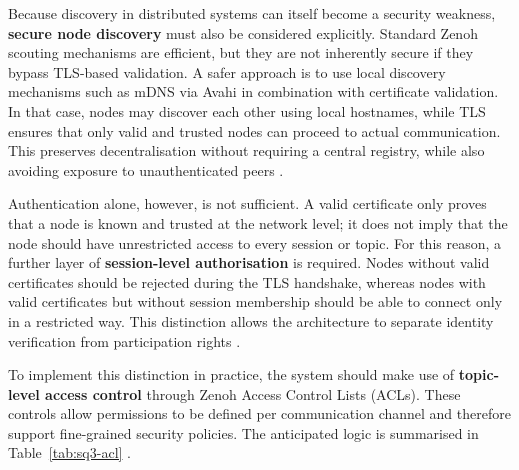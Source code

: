 \documentclass[11pt]{article}
\begin{document}
Because discovery in distributed systems can itself become a security weakness, \textbf{secure node discovery} must also be considered explicitly. Standard Zenoh scouting mechanisms are efficient, but they are not inherently secure if they bypass TLS-based validation. A safer approach is to use local discovery mechanisms such as mDNS via Avahi in combination with certificate validation. In that case, nodes may discover each other using local hostnames, while TLS ensures that only valid and trusted nodes can proceed to actual communication. This preserves decentralisation without requiring a central registry, while also avoiding exposure to unauthenticated peers \cite{mitev2026}.

Authentication alone, however, is not sufficient. A valid certificate only proves that a node is known and trusted at the network level; it does not imply that the node should have unrestricted access to every session or topic. For this reason, a further layer of \textbf{session-level authorisation} is required. Nodes without valid certificates should be rejected during the TLS handshake, whereas nodes with valid certificates but without session membership should be able to connect only in a restricted way. This distinction allows the architecture to separate identity verification from participation rights \cite{mitev2026}.

To implement this distinction in practice, the system should make use of \textbf{topic-level access control} through Zenoh Access Control Lists (ACLs). These controls allow permissions to be defined per communication channel and therefore support fine-grained security policies. The anticipated logic is summarised in Table~\ref{tab:sq3-acl} \cite{mitev2026}.
\end{document}
